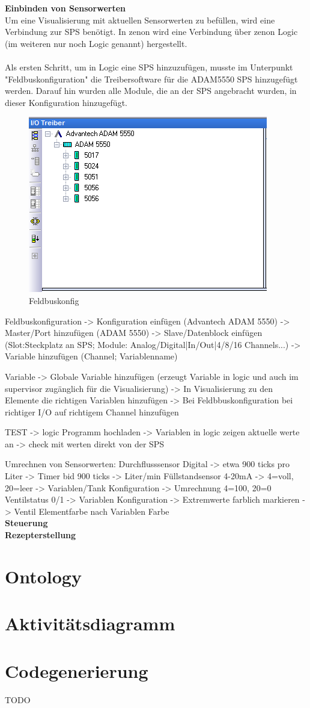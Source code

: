 \textbf{Einbinden von Sensorwerten}\\
Um eine Visualisierung mit aktuellen Sensorwerten zu befüllen, wird eine Verbindung zur SPS benötigt. In zenon wird eine Verbindung über zenon Logic (im weiteren nur noch Logic genannt) hergestellt.\\
\\
Als ersten Schritt, um in Logic eine SPS hinzuzufügen, musste im Unterpunkt "Feldbuskonfiguration" die Treibersoftware für die ADAM5550 SPS hinzugefügt werden. Darauf hin wurden alle Module, die an der SPS angebracht wurden, in dieser Konfiguration hinzugefügt.\\
\begin{figure}[h!]
  \includegraphics{graphics/implementation/Feldbuskonfiguration}
  \caption{Feldbuskonfig}%
\end{figure}

Feldbuskonfiguration -> Konfiguration einfügen (Advantech ADAM 5550) -> Master/Port hinzufügen (ADAM 5550) -> Slave/Datenblock einfügen (Slot:Steckplatz an SPS; Module: Analog/Digital|In/Out|4/8/16 Channels...) -> Variable hinzufügen (Channel; Variablenname)

Variable -> Globale Variable hinzufügen (erzeugt Variable in logic und auch im supervisor zugänglich für die Visualisierung) -> In Visualisierung zu den Elemente die richtigen Variablen hinzufügen -> Bei Feldbbuskonfiguration bei richtiger I/O auf richtigem Channel hinzufügen

TEST -> logic Programm hochladen -> Variablen in logic zeigen aktuelle werte an -> check mit werten direkt von der SPS


Umrechnen von Sensorwerten: 
Durchflusssensor Digital -> etwa 900 ticks pro Liter -> Timer bid 900 ticks -> Liter/min
Füllstandsensor 4-20mA -> 4=voll, 20=leer -> Variablen/Tank Konfiguration -> Umrechnung 4=100, 20=0
Ventilstatus 0/1 -> Variablen Konfiguration -> Extremwerte farblich markieren -> Ventil Elementfarbe nach Variablen Farbe
\\
\textbf{Steuerung}\\

\textbf{Rezepterstellung}\\


\section{Ontology}
\section{Aktivitätsdiagramm}
\section{Codegenerierung}

TODO